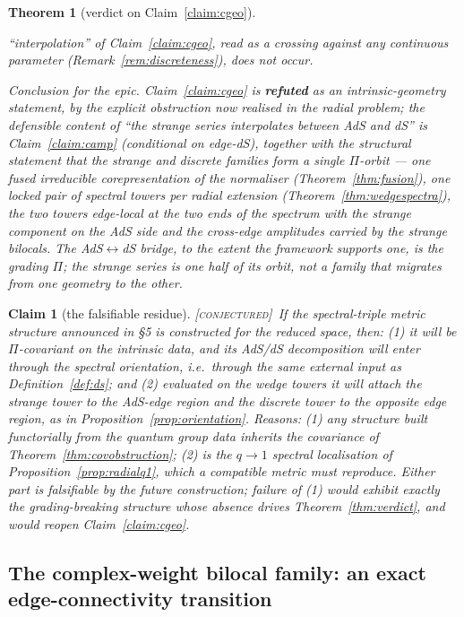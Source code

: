 \documentclass[11pt,a4paper]{article}
\newcommand{\CONJ}{{\color{violet}\textsc{[conjectured]}}}
\theoremstyle{definition}
\theoremstyle{plain}
\newtheorem{theorem}[definition]{Theorem}
\newtheorem{claim}[definition]{Claim}
\begin{document}
\begin{theorem}[verdict on Claim~\ref{claim:cgeo}]
\begin{enumerate}[label=(\roman*)]
``interpolation'' of Claim~\ref{claim:cgeo}, read as a crossing against any continuous
parameter (Remark~\ref{rem:discreteness}), does not occur.
\end{enumerate}
\emph{Conclusion for the epic.} Claim~\ref{claim:cgeo} is \textbf{refuted} as an
intrinsic-geometry statement, by the explicit obstruction now realised in the radial
problem; the defensible content of ``the strange series interpolates between AdS and dS''
is Claim~\ref{claim:camp} (conditional on edge-dS), \emph{together with} the structural
statement that the strange and discrete families form a single $\Pi$-orbit --- one fused
irreducible corepresentation of the normaliser (Theorem~\ref{thm:fusion}), one locked pair
of spectral towers per radial extension (Theorem~\ref{thm:wedgespectra}), the two towers
edge-local at the two ends of the spectrum with the strange component on the AdS side and
the cross-edge amplitudes carried by the strange bilocals. The AdS$\leftrightarrow$dS
bridge, to the extent the framework supports one, is the \emph{grading} $\Pi$; the strange
series is one half of its orbit, not a family that migrates from one geometry to the other.
\end{theorem}

\begin{claim}[the falsifiable residue]\label{conj:residue}
\CONJ\ If the spectral-triple metric structure announced in \cite{Schouten:2025dssyk} \S5
is constructed for the reduced space, then: (1) it will be $\Pi$-covariant on the intrinsic
data, and its AdS/dS decomposition will enter through the spectral orientation, i.e.\
through the same external input as Definition~\ref{def:ds}; and (2) evaluated on the wedge
towers it will attach the strange tower to the AdS-edge region and the discrete tower to
the opposite edge region, as in Proposition~\ref{prop:orientation}. \emph{Reasons}: (1) any
structure built functorially from the quantum group data inherits the covariance of
Theorem~\ref{thm:covobstruction}; (2) is the $q\to1$ spectral localisation of
Proposition~\ref{prop:radialq1}, which a compatible metric must reproduce. Either part is
falsifiable by the future construction; failure of (1) would exhibit exactly the
grading-breaking structure whose absence drives Theorem~\ref{thm:verdict}, and would
reopen Claim~\ref{claim:cgeo}.
\end{claim}

\subsection{The complex-weight bilocal family: an exact edge-connectivity transition}
\label{sec:transition}
\end{document}
